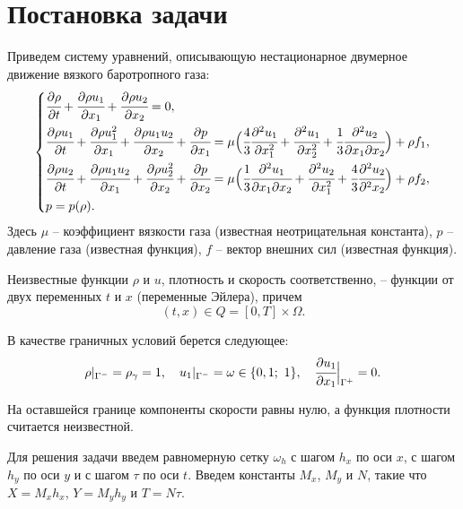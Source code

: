 
\section{Постановка задачи} \label{sec:1-postanovka-zadachi}
Приведем систему уравнений, описывающую нестационарное двумерное движение вязкого баротропного газа:
\begin{equation}
\left\{
	\begin{aligned}
    	&\cfrac{\partial \rho}{\partial t} + \cfrac{\partial \rho u_1}{\partial x_1}+ \cfrac{\partial \rho u_2}{\partial x_2} = 0, \\
	    & 
\cfrac{\partial \rho u_1}{\partial t} + \cfrac{\partial \rho u_1^2}{\partial x_1} + \cfrac{\partial \rho u_1 u_2}{\partial x_2} 
	+ \cfrac{\partial p}{\partial x_1} 
	= \mu \Big(\cfrac{4}{3}\cfrac{\partial^2 u_1}{\partial x_1^2} + \cfrac{\partial^2 u_1}{\partial x_2^2}
	+  \cfrac{1}{3}\cfrac{\partial^2 u_2}{\partial x_1\partial x_2} \Big) + \rho f_1, \\
		&
\cfrac{\partial \rho u_2}{\partial t} + \cfrac{\partial \rho u_1 u_2}{\partial x_1} + \cfrac{\partial \rho u_2^2}{\partial x_2}
	+ \cfrac{\partial p}{\partial x_2} 
	= \mu \Big(\cfrac{1}{3}\cfrac{\partial^2 u_1}{\partial x_1\partial x_2} + \cfrac{\partial^2 u_2}{\partial x_1^2}
	+  \cfrac{4}{3}\cfrac{\partial^2 u_2}{\partial^2 x_2} \Big) + \rho f_2, \\
    	& p = p (\rho).
	\end{aligned}
\right.
\label{eq:1-nachal-zadacha}
\end{equation}
Здесь $\mu$ -- коэффициент вязкости газа (известная неотрицательная константа), $p$ -- давление газа (известная функция), $f$ -- вектор внешних сил (известная функция).

Неизвестные функции $\rho$ и $u$, плотность и скорость соответственно, -- функции от двух переменных $t$ и $x$ (переменные Эйлера), причем $$(t, x) \in Q = [0, T] \times \Omega.$$

В качестве граничных условий берется следующее:
\begin{equation}
\rho|_{\Gamma^-} = \rho_{\gamma} = 1,\quad u_1|_{\Gamma^-} = \omega \in \{0,1;\  1\},\quad \cfrac{\partial u_1}{\partial x_1}\Big|_{\Gamma^+} = 0. \label{eq:1-usl2}
\end{equation}

На оставшейся границе компоненты скорости равны нулю, а функция плотности считается неизвестной.

Для решения задачи введем равномерную сетку $\omega_h$ с шагом $h_x$ по оси $x$, с шагом $h_y$ по оси $y$ и с шагом $\tau$ по оси $t$. 
Введем константы $M_x$, $M_y$ и $N$, такие что $X = M_xh_x$, $Y= M_y h_y$ и $T = N\tau$.
